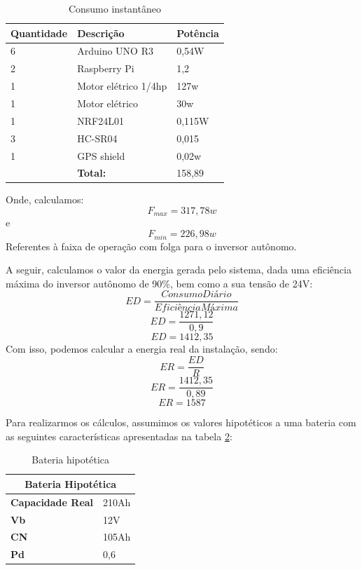 \begin{table}[]
\centering
\caption{Consumo instantâneo}
\label{cap:proposta:tab:instantaneo}
\begin{tabular}{l|l|l|}
\hline
\multicolumn{1}{|l|}{\textbf{Quantidade}} & \textbf{Descrição}   & \textbf{Potência} \\ \hline
\multicolumn{1}{|l|}{6}                   & Arduino UNO R3       & 0,54W             \\ \hline
\multicolumn{1}{|l|}{2}                   & Raspberry Pi         & 1,2               \\ \hline
\multicolumn{1}{|l|}{1}                   & Motor elétrico 1/4hp & 127w             \\ \hline
\multicolumn{1}{|l|}{1}                   & Motor elétrico       & 30w               \\ \hline
\multicolumn{1}{|l|}{1}                   & NRF24L01             & 0,115W            \\ \hline
\multicolumn{1}{|l|}{3}                   & HC-SR04              & 0,015             \\ \hline
\multicolumn{1}{|l|}{1}                   & GPS shield           & 0,02w             \\ \hline
                                          & \textbf{Total:}      & 158,89        \\ \cline{2-3} 
\end{tabular}
\end{table}
Onde, calculamos:
\[F_{max}=317,78w\] e \[F_{min}=226,98w\]
Referentes à faixa de operação com folga para o inversor autônomo. 

A seguir, calculamos o valor da energia gerada pelo sistema, dada uma eficiência máxima do inversor autônomo de 90\%, bem como a sua tensão de 24V:
\[ED =\frac{Consumo Diário}{Eficiência Máxima}\]
\[ED = \frac{1271,12}{0,9}\]
\[ED = 1412,35\]
Com isso, podemos calcular a energia real da instalação, sendo:
\[ER=\frac{ED}{R}\]
\[ER=\frac{1412,35}{0,89}\]
\[ER=1587\]

Para realizarmos os cálculos, assumimos os valores hipotéticos a uma bateria com as seguintes características apresentadas na tabela \ref{cap:proposta:tab:bateria}:
\begin{table}[h]
\centering
\caption{Bateria hipotética}
\label{cap:proposta:tab:bateria}
\begin{tabular}{|l|l|}
\hline
\multicolumn{2}{|c|}{\textbf{Bateria Hipotética}} \\ \hline
\textbf{Capacidade Real}          & 210Ah         \\ \hline
\textbf{Vb}                       & 12V           \\ \hline
\textbf{CN}                       & 105Ah         \\ \hline
\textbf{Pd}                       & 0,6           \\ \hline
\end{tabular}
\end{table}

